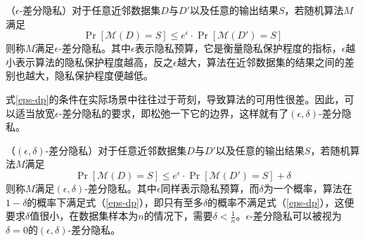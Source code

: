 \begin{definition}
	（$\epsilon$-差分隐私\cite{dwork2006our}）对于任意近邻数据集$D$与$D'$以及任意的输出结果$S$，若随机算法$M$满足
	\begin{equation}
		\label{eps-dp}
		\Pr[\mathcal{M}(D) = S] \leq e^{\epsilon} \cdot \Pr[\mathcal{M}(D') = S]
	\end{equation}
	则称$M$满足$\epsilon$-差分隐私。其中$\epsilon$表示隐私预算，它是衡量隐私保护程度的指标，$\epsilon$越小表示算法的隐私保护程度越高，反之$\epsilon$越大，算法在近邻数据集的结果之间的差别也越大，隐私保护程度便越低。
\end{definition}

式\ref{eps-dp}的条件在实际场景中往往过于苛刻，导致算法的可用性很差。因此，可以适当放宽$\epsilon$-差分隐私的要求，即松弛一下它的边界，这样就有了$(\epsilon, \delta)$-差分隐私。

\begin{definition}
	（$(\epsilon, \delta)$-差分隐私\cite{Algorithmic_Foundations_of_DP}）对于任意近邻数据集$D$与$D'$以及任意的输出结果$S$，若随机算法$M$满足
	\begin{equation}
		\label{eps-delta-dp}
		\Pr[\mathcal{M}(D) = S] \leq e^{\epsilon} \cdot \Pr[\mathcal{M}(D') = S] + \delta
	\end{equation}
	则称$M$满足$(\epsilon, \delta)$-差分隐私。其中$\epsilon$同样表示隐私预算，而$\delta$为一个概率，算法在$1-\delta$的概率下满足式（\ref{eps-dp}），即只有至多$\delta$的概率不满足式（\ref{eps-dp}），这便要求$\delta$值很小，在数据集样本为$n$的情况下\cite{Mechanism_DP}，需要$\delta<\frac{1}{n}$。$\epsilon$-差分隐私可以被视为$\delta=0$的$(\epsilon, \delta)$-差分隐私。
\end{definition}



